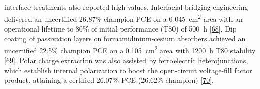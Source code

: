 \documentclass[
  11pt,
]{article}
\begin{document}
interface treatments also reported high values. Interfacial bridging
engineering delivered an uncertified 26.87\% champion PCE on a
\qty{0.045}{\centi\meter\squared} area with an operational lifetime to
80\% of initial performance (T80) of \qty{500}{\hour}
{[}\href{https://doi.org/10.1002/anie.9286497}{68}{]}. Dip coating of
passivation layers on formamidinium-cesium absorbers achieved an
uncertified 22.5\% champion PCE on a \qty{0.105}{\centi\meter\squared}
area with \qty{1200}{\hour} T80 stability
{[}\href{https://doi.org/10.1002/solr.70324}{69}{]}. Polar charge
extraction was also assisted by ferroelectric heterojunctions, which
establish internal polarization to boost the open-circuit voltage-fill
factor product, attaining a certified 26.07\% PCE (26.62\% champion)
{[}\href{https://doi.org/10.1038/s41467-026-69391-3}{70}{]}.
\end{document}
